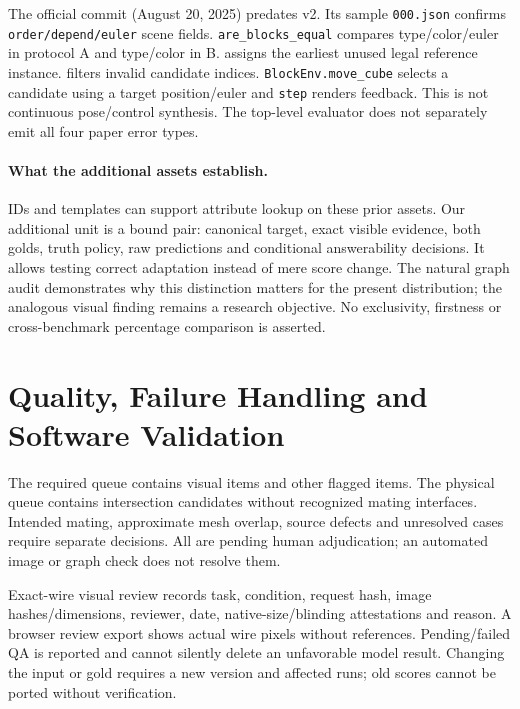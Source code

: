 \documentclass[10pt,letterpaper]{article}
\begin{document}
The official commit
 (August 20, 2025)
predates v2. Its sample \texttt{000.json} confirms
\texttt{order/depend/euler} scene fields.
\texttt{are\_blocks\_equal} compares type/color/euler in protocol A
and type/color in B.  assigns the
earliest unused legal reference instance.
 filters invalid candidate indices.
\texttt{BlockEnv.move\_cube} selects a candidate using a target
position/euler and \texttt{step} renders feedback. This is not
continuous pose/control synthesis. The top-level evaluator does not
separately emit all four paper error types.

\paragraph{What the additional assets establish.}
IDs and templates can support attribute lookup on these prior assets.
Our additional unit is a bound pair: canonical target, exact visible
evidence, both golds, truth policy, raw predictions and conditional
answerability decisions. It allows testing correct adaptation instead
of mere score change. The natural graph audit demonstrates why this
distinction matters for the present distribution; the analogous
visual finding remains a research objective. No exclusivity,
firstness or cross-benchmark percentage comparison is asserted.

\clearpage
\section{Quality, Failure Handling and Software Validation}
The required queue contains \EvVisual{} visual items and
\EvOtherPending{} other flagged items.
The physical queue contains \EvPhysicalPending{} intersection
candidates without recognized mating interfaces. Intended mating,
approximate mesh overlap, source defects and unresolved cases require
separate decisions. All are pending human adjudication; an automated
image or graph check does not resolve them.

Exact-wire visual review records task, condition, request hash,
image hashes/dimensions, reviewer, date, native-size/blinding
attestations and reason. A browser review export shows actual wire
pixels without references. Pending/failed QA is reported and cannot
silently delete an unfavorable model result. Changing the input or
gold requires a new version and affected runs; old scores cannot be
ported without verification.
\end{document}
